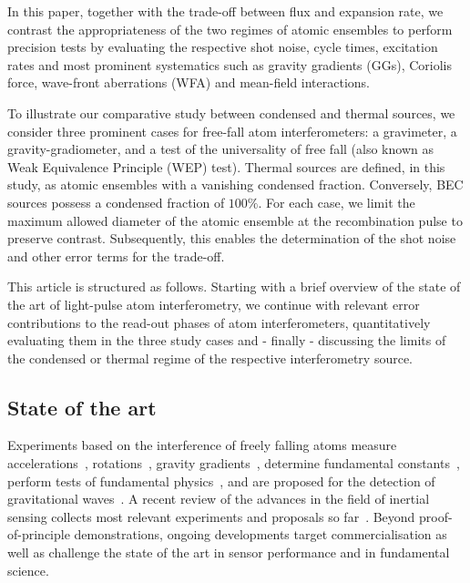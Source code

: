 In this paper, together with the trade-off between flux and expansion rate, we contrast the appropriateness of the two regimes of atomic ensembles to perform precision tests by evaluating the respective shot noise, cycle times, excitation rates and most prominent systematics such as gravity gradients (GGs), Coriolis force, wave-front aberrations (WFA) and mean-field interactions.

To illustrate our comparative study between condensed and thermal sources, we consider three prominent cases for free-fall atom interferometers: a gravimeter, a gravity-gradiometer, and a test of the universality of free fall (also known as Weak Equivalence Principle (WEP) test). Thermal sources are defined, in this study, as atomic ensembles with a vanishing condensed fraction. Conversely, BEC sources possess a condensed fraction of $100\%$.
For each case, we limit the maximum allowed diameter of the atomic ensemble at the recombination pulse to preserve contrast.
Subsequently, this enables the determination of the shot noise and other error terms for the trade-off.

This article is structured as follows. Starting with a brief overview of the state of the art of light-pulse atom interferometry, we continue with relevant error contributions to the read-out phases of atom interferometers, quantitatively evaluating them in the three study cases and - finally - discussing the limits of the condensed or thermal regime of the respective interferometry source.
%
\subsection{State of the art}
Experiments based on the interference of freely falling atoms measure accelerations~\cite{Peters1999,Geiger2020arxiv}, rotations~\cite{Gustavson1997,Gustavson2000,Durfee2006,Canuel2006,Dutta2016}, gravity gradients~\cite{Snadden1998,Bertoldi2006}, determine fundamental constants~\cite{Bouchendira2011,Parker2018,Rosi2014}, perform tests of fundamental physics~\cite{Fray2004,Bouchendira2011,Rosi2014,Schlippert2014,Tarallo2014,Zhou2015,Asenbaum2020arxiv,Albers2020}, and are proposed for the detection of gravitational waves~\cite{Graham2013,Hogan2016,Loriani2019,Schubert2019arxiv,Canuel2018}.
A recent review of the advances in the field of inertial sensing collects most relevant experiments and proposals so far~\cite{Geiger2020arxiv}.
Beyond proof-of-principle demonstrations, ongoing developments target commercialisation as well as challenge the state of the art in sensor performance and in fundamental science.

